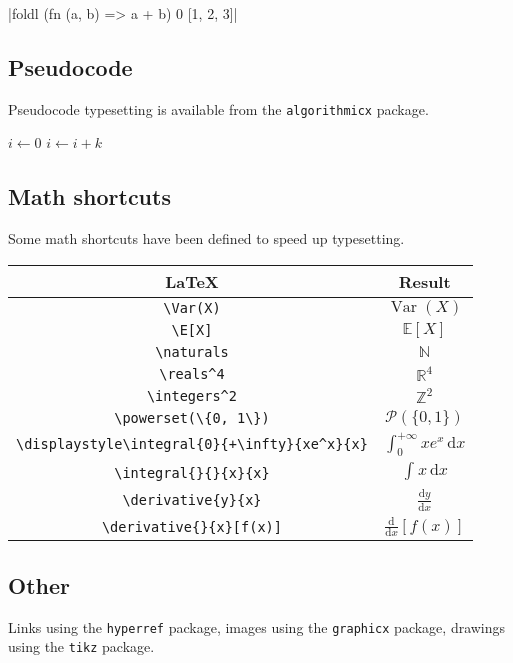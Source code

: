 \documentclass{article}
\theoremstyle{plain}
\theoremstyle{definition}
\theoremstyle{remark}
\DeclareMathOperator*{\Var}{Var}
\newcommand{\E}{\mathbb{E}}
\newcommand{\naturals}{\mathbb{N}}
\newcommand{\reals}{\mathbb{R}}
\newcommand{\integers}{\mathbb{Z}}
\newcommand{\powerset}{\mathcal{P}}
\newcommand{\integral}[4]{\int_{#1}^{#2} #3 \,\mathrm{d}#4}
\newcommand{\derivative}[2]{\frac{\mathrm{d}#1}{\mathrm{d}#2}}
\begin{document}
\smlshort|foldl (fn (a, b) => a + b) 0 [1, 2, 3]|

\subsection{Pseudocode}

Pseudocode typesetting is available from the \texttt{algorithmicx} package.

\begin{algorithmic}[1]
    \State $i\gets 0$
\Else
        \State $i\gets i+k$
    \EndIf
\EndIf
\end{algorithmic}

\subsection{Math shortcuts}

Some math shortcuts have been defined to speed up typesetting.

\begin{center}
\begin{tabular}{cc}
\hline
\textbf{\LaTeX} & \textbf{Result}\\
\hline
\verb|\Var(X)| & $\Var(X)$ \\
\verb|\E[X]| & $\E[X]$ \\
\verb|\naturals| & $\naturals$ \\
\verb|\reals^4| & $\reals^4$ \\
\verb|\integers^2| & $\integers^2$ \\
\verb|\powerset(\{0, 1\})| & $\powerset(\{0, 1\})$ \\
\verb|\displaystyle\integral{0}{+\infty}{xe^x}{x}| & $\displaystyle\integral{0}{+\infty}{xe^x}{x}$ \\
\verb|\integral{}{}{x}{x}| & $\integral{}{}{x}{x}$ \\
\verb|\derivative{y}{x}| & $\derivative{y}{x}$ \\
\verb|\derivative{}{x}[f(x)]| & $\derivative{}{x}[f(x)]$ \\
\hline
\end{tabular}
\end{center}

\subsection{Other}

Links using the \texttt{hyperref} package, images using the \texttt{graphicx} package, drawings using the \texttt{tikz} package.
\end{document}
